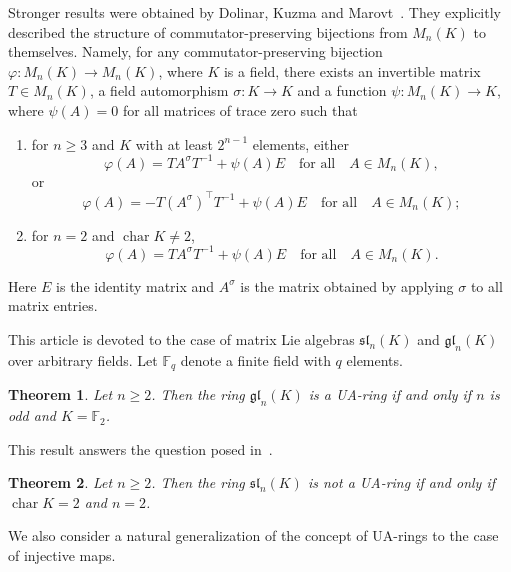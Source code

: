 \documentclass[a4paper,reqno,12pt]{amsart}
\newtheorem{lettertheorem}{Theorem}
\theoremstyle{definition}
\theoremstyle{remark}
\DeclareMathOperator{\Char}{char}
\def\FF{{\mathbb F}}
\def\gl{\mathfrak{gl}}
\def\sl{\mathfrak{sl}}
\renewcommand{\phi}{\varphi}
\renewcommand{\ge}{\geqslant}
\begin{document}
	Stronger results were obtained by Dolinar, Kuzma and Marovt~\cite{Dolinar}. They explicitly described the structure of commutator-preserving bijections from $M_n(K)$ to themselves. Namely, for any commutator-preserving bijection $\phi : M_n(K) \rightarrow M_n(K)$, where $K$ is a field, there exists an invertible matrix $T \in M_n(K)$, a field automorphism $\sigma : K \rightarrow K$ and a function $\psi : M_n(K) \rightarrow K$, where $\psi(A) = 0$ for all matrices of trace zero such that
	\begin{enumerate}
		\item for $n \ge 3$ and $K$ with at least $2^{n - 1}$ elements, either
		\begin{equation*}
			\phi(A) = TA^{\sigma}T^{-1} + \psi(A)E \quad \text{for all} \quad A \in M_n(K),
		\end{equation*}
		or
		\begin{equation*}
			\phi(A) = -T(A^{\sigma})^{\top}T^{-1} + \psi(A)E \quad \text{for all} \quad A \in M_n(K);
		\end{equation*}
		\item for $n = 2$ and $\Char K \neq 2$,
		\begin{equation*}
			\phi(A) = TA^{\sigma}T^{-1} + \psi(A)E \quad \text{for all} \quad A \in M_n(K).
		\end{equation*}
	\end{enumerate}
	Here $E$ is the identity matrix and $A^{\sigma}$ is the matrix obtained by applying $\sigma$ to all matrix entries.

	This article is devoted to the case of matrix Lie algebras $\sl_n(K)$ and $\gl_n(K)$ over arbitrary fields. Let $\FF_q$ denote a finite field with $q$ elements.

	\begin{lettertheorem}\label{theorem:when_glIsUA}
		Let $n \ge 2$. Then the ring $\gl_n(K)$ is a UA-ring if and only if $n$ is odd and $K = \FF_2$.
	\end{lettertheorem}
	
	This result answers the question posed in~\cite[Problem 1]{arzhantsev2025uniqueness}.
	
	\begin{lettertheorem}\label{theorem:when_slIsUA}
		Let $n \ge 2$. Then the ring $\sl_n(K)$ is not a UA-ring if and only if $\Char K = 2$ and $n = 2$.
	\end{lettertheorem}

	We also consider a natural generalization of the concept of UA-rings to the case of injective maps.
\end{document}
